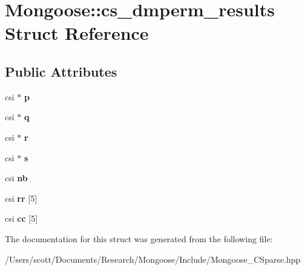 \hypertarget{struct_mongoose_1_1cs__dmperm__results}{}\section{Mongoose\+:\+:cs\+\_\+dmperm\+\_\+results Struct Reference}
\label{struct_mongoose_1_1cs__dmperm__results}
\subsection*{Public Attributes}
\begin{DoxyCompactItemize}
\item 
\hypertarget{struct_mongoose_1_1cs__dmperm__results_ac73b3722f53bfafe910cd7cac151c84e}{}\label{struct_mongoose_1_1cs__dmperm__results_ac73b3722f53bfafe910cd7cac151c84e} 
csi $\ast$ {\bfseries p}
\item 
\hypertarget{struct_mongoose_1_1cs__dmperm__results_ac53565f1f9cc4f9ad42a4d0d0fc759d4}{}\label{struct_mongoose_1_1cs__dmperm__results_ac53565f1f9cc4f9ad42a4d0d0fc759d4} 
csi $\ast$ {\bfseries q}
\item 
\hypertarget{struct_mongoose_1_1cs__dmperm__results_a153cf8c996863e8003cf11f452c453e2}{}\label{struct_mongoose_1_1cs__dmperm__results_a153cf8c996863e8003cf11f452c453e2} 
csi $\ast$ {\bfseries r}
\item 
\hypertarget{struct_mongoose_1_1cs__dmperm__results_a5208fdeb0147a3b75d721248d60efa87}{}\label{struct_mongoose_1_1cs__dmperm__results_a5208fdeb0147a3b75d721248d60efa87} 
csi $\ast$ {\bfseries s}
\item 
\hypertarget{struct_mongoose_1_1cs__dmperm__results_aeefa353a17e422c1f949949c90b7aeee}{}\label{struct_mongoose_1_1cs__dmperm__results_aeefa353a17e422c1f949949c90b7aeee} 
csi {\bfseries nb}
\item 
\hypertarget{struct_mongoose_1_1cs__dmperm__results_a1c68d111650710119ef59c83c995af3a}{}\label{struct_mongoose_1_1cs__dmperm__results_a1c68d111650710119ef59c83c995af3a} 
csi {\bfseries rr} \mbox{[}5\mbox{]}
\item 
\hypertarget{struct_mongoose_1_1cs__dmperm__results_a0cb56ec389b8cd56fbb13cb853eca2d1}{}\label{struct_mongoose_1_1cs__dmperm__results_a0cb56ec389b8cd56fbb13cb853eca2d1} 
csi {\bfseries cc} \mbox{[}5\mbox{]}
\end{DoxyCompactItemize}


The documentation for this struct was generated from the following file\+:\begin{DoxyCompactItemize}
\item 
/\+Users/scott/\+Documents/\+Research/\+Mongoose/\+Include/Mongoose\+\_\+\+C\+Sparse.\+hpp\end{DoxyCompactItemize}
